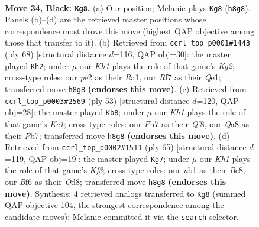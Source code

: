\documentclass[11pt]{article}
\begin{document}
\clearpage

\begin{figure}[p]\centering
\begin{subfigure}{0.46\textwidth}\centering
\resizebox{\linewidth}{!}{%
\newchessgame
\chessboard[
  setfen={q1b4k/p2n1r1p/1r3b2/2p2P2/Pp1p4/1P1Q2N1/R3P3/1NBK1R2 b - - 0 34},
  showmover=false,
  pgfstyle=straightmove, color=movearrow, markmove={h8-g8}
]}
\caption{}
\end{subfigure}\hfill
\begin{subfigure}{0.46\textwidth}\centering
\resizebox{\linewidth}{!}{%
\newchessgame
\chessboard[
  setfen={r5k1/2rb1p2/1n1q2p1/1P1p3p/p2N3P/4P1P1/R3BPK1/R3Q3 w - - 18 35},
  showmover=false,
  pgfstyle=straightmove, color=movearrow, markmove={g2-h2}
]}
\caption{}
\end{subfigure}
\\[4pt]
\begin{subfigure}{0.46\textwidth}\centering
\resizebox{\linewidth}{!}{%
\newchessgame
\chessboard[
  setfen={2kr1q1r/1p1bnp2/p3p3/3pP1R1/3P1Q2/2N5/PP2BP2/1K1R4 b - - 1 27},
  showmover=false,
  pgfstyle=straightmove, color=movearrow, markmove={c8-b8}
]}
\caption{}
\end{subfigure}\hfill
\begin{subfigure}{0.46\textwidth}\centering
\resizebox{\linewidth}{!}{%
\newchessgame
\chessboard[
  setfen={2bq4/2r4p/p2p1kp1/1pnPp3/4P3/P4N2/BP1Q1PP1/4R1K1 b - - 1 33},
  showmover=false,
  pgfstyle=straightmove, color=movearrow, markmove={f6-g7}
]}
\caption{}
\end{subfigure}
\caption{\textbf{Move 34, Black: \texttt{Kg8}.} (a) Our position; Melanie plays \texttt{Kg8} (\texttt{h8g8}). Panels (b)--(d) are the retrieved master positions whose correspondence most drove this move (highest QAP objective among those that transfer to it). (b) Retrieved from \texttt{ccrl\_top\_p0001\#1443} (ply 68) [structural distance $d$=116, QAP obj=30]: the master played \texttt{Kh2}; under $\mu$ our \emph{Kh1} plays the role of that game's \emph{Kg2}; cross-type roles: our \emph{p}e2 as their \emph{R}a1, our \emph{R}f7 as their \emph{Q}e1; transferred move \texttt{h8g8} \textbf{(endorses this move)}. (c) Retrieved from \texttt{ccrl\_top\_p0003\#2569} (ply 53) [structural distance $d$=120, QAP obj=28]: the master played \texttt{Kb8}; under $\mu$ our \emph{Kh1} plays the role of that game's \emph{Kc1}; cross-type roles: our \emph{P}h7 as their \emph{Q}f8, our \emph{Q}a8 as their \emph{P}b7; transferred move \texttt{h8g8} \textbf{(endorses this move)}. (d) Retrieved from \texttt{ccrl\_top\_p0002\#1511} (ply 65) [structural distance $d$=119, QAP obj=19]: the master played \texttt{Kg7}; under $\mu$ our \emph{Kh1} plays the role of that game's \emph{Kf3}; cross-type roles: our \emph{n}b1 as their \emph{B}c8, our \emph{B}f6 as their \emph{Q}d8; transferred move \texttt{h8g8} \textbf{(endorses this move)}. Synthesis: 4 retrieved analogs transferred to \texttt{Kg8} (summed QAP objective 104, the strongest correspondence among the candidate moves); Melanie committed it via the \texttt{search} selector.}
\label{fig:thought-m67}
\end{figure}
\end{document}
